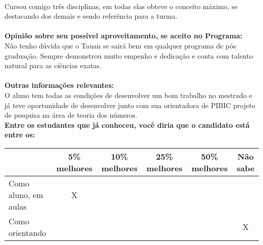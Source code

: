 \documentclass[11pt]{article}
\begin{document}
\\Cursou comigo três disciplinas, em todas elas obteve o conceito máximo, se destacando dos demais e sendo referência para a turma.\\
\\
\textbf{Opinião sobre seu possível aproveitamento, se aceito no Programa:}
\\Não tenho dúvida que o Tauan se sairá bem em qualquer programa de pós graduação. Sempre demonstrou muito empenho e dedicação e conta com talento natural para as ciências exatas.\\ 
\\
\textbf{Outras informações relevantes:} \\O aluno tem todas as condições de desenvolver um bom trabalho no mestrado e já teve oportunidade de desenvolver junto com sua orientadora de PIBIC projeto de pesquisa na área de teoria dos números.
\\[0.3cm]
\textbf{Entre os estudantes que já conheceu, você diria que o candidato está entre os:}
\\
\begin{tabular}{|l|c|c|c|c|c|}
\hline
 & 5\% melhores & 10\% melhores & 25\% melhores & 50\% melhores & Não sabe \\
\hline
Como aluno, em aulas & X &  &  &  & \\
\hline
Como orientando &  &  &  &  & X\\
\hline
\end{tabular}
\end{document}
